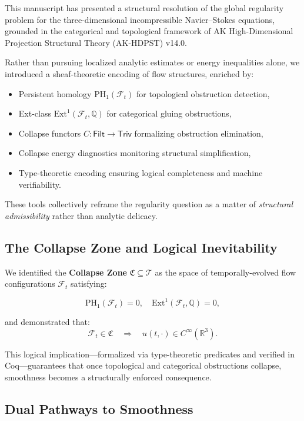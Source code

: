 \documentclass[11pt]{article}
\begin{document}
This manuscript has presented a structural resolution of the global regularity problem for the three-dimensional incompressible Navier–Stokes equations, grounded in the categorical and topological framework of AK High-Dimensional Projection Structural Theory (AK-HDPST) v14.0.

Rather than pursuing localized analytic estimates or energy inequalities alone, we introduced a sheaf-theoretic encoding of flow structures, enriched by:

\begin{itemize}
  \item Persistent homology \(\mathrm{PH}_1(\mathcal{F}_t)\) for topological obstruction detection,
  \item Ext-class \(\mathrm{Ext}^1(\mathcal{F}_t, \mathbb{Q})\) for categorical gluing obstructions,
  \item Collapse functors \(C : \mathsf{Filt} \to \mathsf{Triv}\) formalizing obstruction elimination,
  \item Collapse energy diagnostics monitoring structural simplification,
  \item Type-theoretic encoding ensuring logical completeness and machine verifiability.
\end{itemize}

These tools collectively reframe the regularity question as a matter of \emph{structural admissibility} rather than analytic delicacy.

\subsection{The Collapse Zone and Logical Inevitability}

We identified the \textbf{Collapse Zone} \( \mathfrak{C} \subseteq \mathcal{T} \) as the space of temporally-evolved flow configurations \( \mathcal{F}_t \) satisfying:

\[
\mathrm{PH}_1(\mathcal{F}_t) = 0, \quad \mathrm{Ext}^1(\mathcal{F}_t, \mathbb{Q}) = 0,
\]

and demonstrated that:
\[
\mathcal{F}_t \in \mathfrak{C} \quad \Longrightarrow \quad u(t, \cdot) \in C^\infty(\mathbb{R}^3).
\]

This logical implication—formalized via type-theoretic predicates and verified in Coq—guarantees that once topological and categorical obstructions collapse, smoothness becomes a structurally enforced consequence.

\subsection{Dual Pathways to Smoothness}
\end{document}
